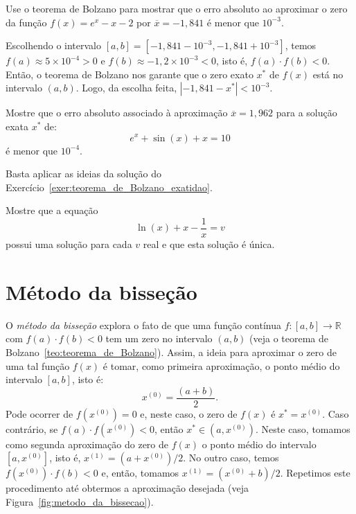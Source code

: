 \begin{exer}\label{exer:teorema_de_Bolzano_exatidao} Use o teorema de Bolzano para mostrar que o erro absoluto ao aproximar o zero da função $f(x)=e^x-x-2$ por $\overline{x}=-1,841$ é menor que $10^{-3}$.
\end{exer}
\begin{resp}

    Escolhendo o intervalo $[a, b] = [-1,841-10^{-3}, -1,841+10^{-3}]$, temos $f(a)\approx 5\times 10^{-4} > 0$ e $f(b)\approx -1,2\times 10^{-3} < 0$, isto é, $f(a)\cdot f(b) < 0$. Então, o teorema de Bolzano nos garante que o zero exato $x^*$ de $f(x)$ está no intervalo $(a, b)$. Logo, da escolha feita, $|-1,841 - x^*| < 10^{-3}$.

\end{resp}

\begin{exer} Mostre que o erro absoluto associado à aproximação $\overline{x} = 1,962$ para a solução exata $x^*$ de:
  \begin{equation}
    e^x+\sin (x) +x = 10
  \end{equation}
é menor que $10^{-4}$.
\end{exer}
\begin{resp}
  Basta aplicar as ideias da solução do Exercício~\ref{exer:teorema_de_Bolzano_exatidao}.
\end{resp}

\begin{exer}\label{existe_unica} Mostre que a equação
  \begin{equation}
    \ln(x)+x-\frac{1}{x}=v
  \end{equation}
possui uma solução para cada $v$ real e que esta solução é única.
\end{exer}

\section{Método da bisseção}

O \emph{método da bisseção} explora o fato de que uma função contínua $f:[a, b]\to \mathbb{R}$ com $f(a)\cdot f(b) < 0$ tem um zero no intervalo $(a, b)$ (veja o teorema de Bolzano~\ref{teo:teorema_de_Bolzano}). Assim, a ideia para aproximar o zero de uma tal função $f(x)$ é tomar, como primeira aproximação, o ponto médio do intervalo $[a, b]$, isto é:
\begin{equation}
  x^{(0)} = \frac{(a + b)}{2}.
\end{equation}
Pode ocorrer de $f(x^{(0)}) = 0$ e, neste caso, o zero de $f(x)$ é $x^* = x^{(0)}$. Caso contrário, se $f(a)\cdot f(x^{(0)}) < 0$, então $x^*\in (a, x^{(0)})$. Neste caso, tomamos como segunda aproximação do zero de $f(x)$ o ponto médio do intervalo $[a, x^{(0)}]$, isto é, $x^{(1)} = (a + x^{(0)})/2$. No outro caso, temos $f(x^{(0)})\cdot f(b) < 0$ e, então, tomamos $x^{(1)} = (x^{(0)} + b)/2$. Repetimos este procedimento até obtermos a aproximação desejada (veja Figura~\ref{fig:metodo_da_bissecao}).


